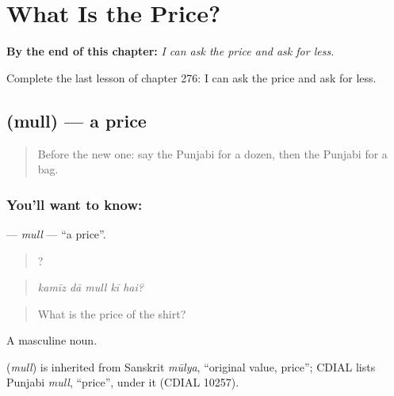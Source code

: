 
\chapter{What Is the Price?}
\label{ch:pa-a2-what-is-the-price}

\begin{chapteropening}
\textbf{By the end of this chapter:} \emph{I can ask the price and ask for less.}

Complete the last lesson of chapter 276: I can ask the price and ask for less.
\end{chapteropening}

\section[\texorpdfstring{\pa{ਮੁੱਲ} (mull)}{ਮੁੱਲ (mull)}]{ (mull) — a price}

\label{lesson:PA-C276-mull}



\begin{quote}
Before the new one: say the Punjabi for a dozen, then the Punjabi for a bag.
\end{quote}

\subsection*{You'll want to know: }
\textbf{} — \emph{mull} — \textquotedblleft{}a price\textquotedblright{}.

\begin{quote}
    ?
\end{quote}

\begin{quote}
\emph{kamīz dā mull kī hai?}
\end{quote}

\begin{quote}
What is the price of the shirt?
\end{quote}

A masculine noun.

\begin{cousinweb}
\textbf{} (\emph{mull}) is inherited from Sanskrit \emph{mūlya}, \textquotedblleft{}original value, price\textquotedblright{}; CDIAL lists Punjabi \emph{mull}, \textquotedblleft{}price\textquotedblright{}, under it (CDIAL 10257).
\end{cousinweb}

